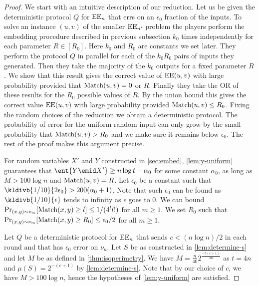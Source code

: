 \begin{proof}
We start with an intuitive description of our reduction. Let us
be given the deterministic protocol $Q$ for $\operatorname{EE}_n$ that errs on
an $\epsilon_0$ fraction of the inputs. To solve an instance
$(u,v)$ of the smaller $\operatorname{EE}_{n'}$ problem the players perform
the embedding procedure described in previous subsection $k_0$
times independently for each parameter $R\in[R_0]$. Here $k_0$
and $R_0$ are constants we set later. They perform the protocol
$Q$ in parallel for each of the $k_0R_0$ pairs of inputs they
generated. Then they take the majority of the $k_0$ outputs for
a fixed parameter $R$. We show that this result gives the
correct value of $\operatorname{EE}(u,v)$ with large probability provided that
$\operatorname{Match}(u,v)=0$ or $R$. Finally they take the OR of these
results for the $R_0$ possible values of $R$. By the union bound
this gives the correct value $\operatorname{EE}(u,v)$ with large probability
provided $\operatorname{Match}(u,v)\le R_0$. Fixing the random choices of the
reduction we obtain a deterministic protocol. The probability of
error for the uniform random input can only grow by the small
probability that $\operatorname{Match}(u,v)>R_0$ and we make sure it remains
below $\epsilon_0$. The rest of the proof makes this argument
precise.

For random variables $X'$ and $Y$ constructed in
\autoref{sec:embed}, \autoref{lem:y-uniform} guarantees that
$\ent{Y\emid X'}\ge n\log t - \alpha_0$ for some constant
$\alpha_0$, as long as $M>100\log n$ and $\operatorname{Match}(u,v)=R$. Let
$\epsilon_0$ be a constant such that $\kldivb{1/10}{2\epsilon_0}
> 200(\alpha_0 + 1)$. Note that such $\epsilon_0$ can be found
as $\kldivb{1/10}{\epsilon}$ tends to infinity as $\epsilon$
goes to 0. We can bound $\Pr_{(x,y)\sim\nu_m}[\operatorname{Match}(x,y) \ge l]
\le 1/(4^l l!)$ for all $m\ge1$. We set $R_0$ such that
$\Pr_{(x,y)\sim\nu_m}[\operatorname{Match}(x,y) \ge R_0 ] \le \epsilon_0 / 2$
for all $m\ge1$.

Let $Q$ be a deterministic protocol for $\operatorname{EE}_n$ that sends $c <
(n\log n)/2$ in each round and that has $\epsilon_0$ error on
$\nu_n$. Let $S$ be as constructed in \autoref{lem:determine-s}
and let $M$ be as defined in \autoref{thm:isoperimetry}. We have
$M=\frac{n}{40}2^{\frac{-5(c+1)}{4n}}$ as $t=4n$ and
$\mu(S)=2^{-(c+1)}$ by \autoref{lem:determine-s}. Note that by
our choice of $c$, we have $M>100\log n$, hence the hypotheses
of \autoref{lem:y-uniform} are satisfied.


\end{proof}
